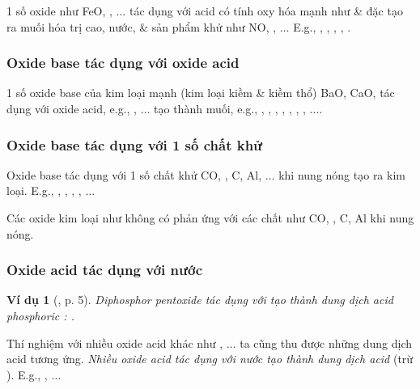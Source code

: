 \documentclass{article}
\newtheorem{vidu}{Ví dụ}
\begin{document}
1 số oxide như FeO, , $\ldots$ tác dụng với acid có tính oxy hóa mạnh như  \&  đặc tạo ra muối hóa trị cao, nước, \& sản phẩm khử như NO, , $\ldots$ E.g., , , , , .

\subsubsection{Oxide base tác dụng với oxide acid}
1 số oxide base của kim loại mạnh (kim loại kiềm \& kiềm thổ) BaO, CaO,  tác dụng với oxide acid, e.g., , $\ldots$ tạo thành muối, e.g., , , , , , , , $\ldots$.

\subsubsection{Oxide base tác dụng với 1 số chất khử}
Oxide base tác dụng với 1 số chất khử CO, , C, Al, $\ldots$ khi nung nóng tạo ra kim loại. E.g., , , , , $\ldots$

Các oxide kim loại như  không có phản ứng với các chất như CO, , C, Al khi nung nóng.

\subsubsection{Oxide acid tác dụng với nước}

\begin{vidu}[\cite{SGK_Hoa_Hoc_9}, p. 5]
	Diphosphor pentoxide {\rm{}} tác dụng với {\rm{}} tạo thành dung dịch acid phosphoric {\rm{}: }.
\end{vidu}
Thí nghiệm với nhiều oxide acid khác như , $\ldots$ ta cũng thu được những dung dịch acid tương ứng. \textit{Nhiều oxide acid tác dụng với nước tạo thành dung dịch acid} (trừ ). E.g., , $\ldots$
\end{document}
